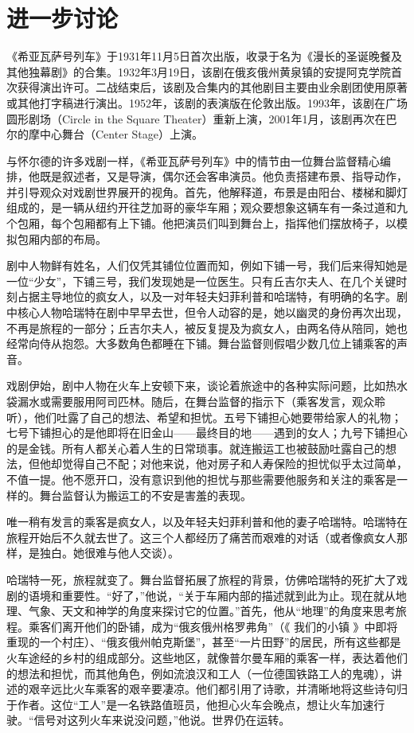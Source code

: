 \documentclass[lang=cn,newtx,12pt,scheme=chinese]{elegantbook}
\begin{document}
\section{进一步讨论}

《希亚瓦萨号列车》于1931年11月5日首次出版，收录于名为《漫长的圣诞晚餐及其他独幕剧》的合集。1932年3月19日，该剧在俄亥俄州黄泉镇的安提阿克学院首次获得演出许可。二战结束后，该剧及合集内的其他剧目主要由业余剧团使用原著或其他打字稿进行演出。1952年，该剧的表演版在伦敦出版。1993年，该剧在广场圆形剧场（Circle in the Square Theater）重新上演，2001年1月，该剧再次在巴尔的摩中心舞台（Center Stage）上演。

与怀尔德的许多戏剧一样，《希亚瓦萨号列车》中的情节由一位舞台监督精心编排，他既是叙述者，又是导演，偶尔还会客串演员。他负责搭建布景、指导动作，并引导观众对戏剧世界展开的视角。首先，他解释道，布景是由阳台、楼梯和脚灯组成的，是一辆从纽约开往芝加哥的豪华车厢；观众要想象这辆车有一条过道和九个包厢，每个包厢都有上下铺。他把演员们叫到舞台上，指挥他们摆放椅子，以模拟包厢内部的布局。

剧中人物鲜有姓名，人们仅凭其铺位位置而知，例如下铺一号，我们后来得知她是一位“少女”，下铺三号，我们发现她是一位医生。只有丘吉尔夫人、在几个关键时刻占据主导地位的疯女人，以及一对年轻夫妇菲利普和哈瑞特，有明确的名字。剧中核心人物哈瑞特在剧中早早去世，但令人动容的是，她以幽灵的身份再次出现，不再是旅程的一部分；丘吉尔夫人，被反复提及为疯女人，由两名侍从陪同，她也经常向侍从抱怨。大多数角色都睡在下铺。舞台监督则假唱少数几位上铺乘客的声音。

戏剧伊始，剧中人物在火车上安顿下来，谈论着旅途中的各种实际问题，比如热水袋漏水或需要服用阿司匹林。随后，在舞台监督的指示下（乘客发言，观众聆听），他们吐露了自己的想法、希望和担忧。五号下铺担心她要带给家人的礼物；七号下铺担心的是他即将在旧金山——最终目的地——遇到的女人；九号下铺担心的是金钱。所有人都关心着人生的日常琐事。就连搬运工也被鼓励吐露自己的想法，但他却觉得自己不配；对他来说，他对房子和人寿保险的担忧似乎太过简单，不值一提。他不愿开口，没有意识到他的担忧与那些需要他服务和关注的乘客是一样的。舞台监督认为搬运工的不安是害羞的表现。

唯一稍有发言的乘客是疯女人，以及年轻夫妇菲利普和他的妻子哈瑞特。哈瑞特在旅程开始后不久就去世了。这三个人都经历了痛苦而艰难的对话（或者像疯女人那样，是独白。她很难与他人交谈）。

哈瑞特一死，旅程就变了。舞台监督拓展了旅程的背景，仿佛哈瑞特的死扩大了戏剧的语境和重要性。“好了，”他说，“关于车厢内部的描述就到此为止。现在就从地理、气象、天文和神学的角度来探讨它的位置。”首先，他从“地理”的角度来思考旅程。乘客们离开他们的卧铺，成为“俄亥俄州格罗弗角”（《 我们的小镇 》中即将重现的一个村庄）、“俄亥俄州帕克斯堡”，甚至“一片田野”的居民，所有这些都是火车途经的乡村的组成部分。这些地区，就像普尔曼车厢的乘客一样，表达着他们的想法和担忧，而其他角色，例如流浪汉和工人（一位德国铁路工人的鬼魂），讲述的艰辛远比火车乘客的艰辛要凄凉。他们都引用了诗歌，并清晰地将这些诗句归于作者。这位“工人”是一名铁路值班员，他担心火车会晚点，想让火车加速行驶。“信号对这列火车来说没问题，”他说。世界仍在运转。
\end{document}
